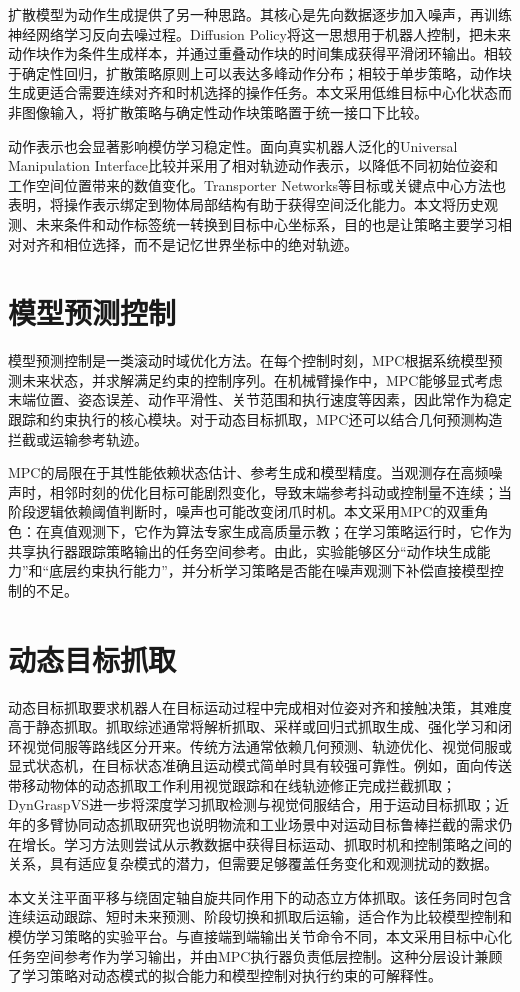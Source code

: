 扩散模型为动作生成提供了另一种思路。其核心是先向数据逐步加入噪声，再训练神经网络学习反向去噪过程\citep{ho2020denoising,song2020denoising}。Diffusion Policy将这一思想用于机器人控制，把未来动作块作为条件生成样本，并通过重叠动作块的时间集成获得平滑闭环输出\citep{chi2023diffusion}。相较于确定性回归，扩散策略原则上可以表达多峰动作分布；相较于单步策略，动作块生成更适合需要连续对齐和时机选择的操作任务。本文采用低维目标中心化状态而非图像输入，将扩散策略与确定性动作块策略置于统一接口下比较。

动作表示也会显著影响模仿学习稳定性。面向真实机器人泛化的Universal Manipulation Interface比较并采用了相对轨迹动作表示，以降低不同初始位姿和工作空间位置带来的数值变化\citep{chi2024universal}。Transporter Networks等目标或关键点中心方法也表明，将操作表示绑定到物体局部结构有助于获得空间泛化能力\citep{zeng2021transporter}。本文将历史观测、未来条件和动作标签统一转换到目标中心坐标系，目的也是让策略主要学习相对对齐和相位选择，而不是记忆世界坐标中的绝对轨迹。

\section{模型预测控制}

模型预测控制是一类滚动时域优化方法。在每个控制时刻，MPC根据系统模型预测未来状态，并求解满足约束的控制序列\citep{rawlings2017model}。在机械臂操作中，MPC能够显式考虑末端位置、姿态误差、动作平滑性、关节范围和执行速度等因素，因此常作为稳定跟踪和约束执行的核心模块。对于动态目标抓取，MPC还可以结合几何预测构造拦截或运输参考轨迹。

MPC的局限在于其性能依赖状态估计、参考生成和模型精度。当观测存在高频噪声时，相邻时刻的优化目标可能剧烈变化，导致末端参考抖动或控制量不连续；当阶段逻辑依赖阈值判断时，噪声也可能改变闭爪时机。本文采用MPC的双重角色：在真值观测下，它作为算法专家生成高质量示教；在学习策略运行时，它作为共享执行器跟踪策略输出的任务空间参考。由此，实验能够区分“动作块生成能力”和“底层约束执行能力”，并分析学习策略是否能在噪声观测下补偿直接模型控制的不足。

\section{动态目标抓取}

动态目标抓取要求机器人在目标运动过程中完成相对位姿对齐和接触决策，其难度高于静态抓取。抓取综述通常将解析抓取、采样或回归式抓取生成、强化学习和闭环视觉伺服等路线区分开来\citep{zhang2022robotic,newbury2023deep}。传统方法通常依赖几何预测、轨迹优化、视觉伺服或显式状态机，在目标状态准确且运动模式简单时具有较强可靠性。例如，面向传送带移动物体的动态抓取工作利用视觉跟踪和在线轨迹修正完成拦截抓取\citep{marturi2017dynamic}；DynGraspVS进一步将深度学习抓取检测与视觉伺服结合，用于运动目标抓取\citep{kopicki2021dyngraspvs}；近年的多臂协同动态抓取研究也说明物流和工业场景中对运动目标鲁棒拦截的需求仍在增长\citep{he2026dynamic}。学习方法则尝试从示教数据中获得目标运动、抓取时机和控制策略之间的关系，具有适应复杂模式的潜力，但需要足够覆盖任务变化和观测扰动的数据。

本文关注平面平移与绕固定轴自旋共同作用下的动态立方体抓取。该任务同时包含连续运动跟踪、短时未来预测、阶段切换和抓取后运输，适合作为比较模型控制和模仿学习策略的实验平台。与直接端到端输出关节命令不同，本文采用目标中心化任务空间参考作为学习输出，并由MPC执行器负责低层控制。这种分层设计兼顾了学习策略对动态模式的拟合能力和模型控制对执行约束的可解释性。
